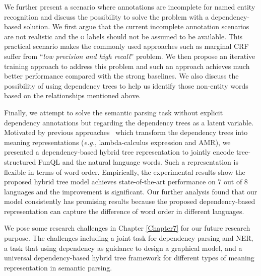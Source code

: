 We further present a scenario where annotations are incomplete for named entity recognition and discuss the possibility to solve the problem with a dependency-based solution.
We first argue that the current incomplete annotation scenarios are not realistic and the \textsc{o} labels should not be assumed to be available. 
This practical scenario makes the commonly used approaches such as marginal CRF~\cite{greenberg2018marginal} suffer from ``\textit{low precision and high recall}'' problem. 
We then propose an iterative training approach to address this problem and such an approach achieves much better performance compared with the strong baselines.
We also discuss the possibility of using dependency trees to help us identify those non-entity words based on the relationships mentioned above. 


Finally, we attempt to solve the semantic parsing task without explicit dependency annotations but regarding the dependency trees as a latent variable. 
Motivated by previous approaches~\cite{reddy2016transforming,wang2015building} which transform the dependency trees into meaning representations (\textit{e.g.}, lambda-calculus expression and AMR), we presented a dependency-based hybrid tree representation to jointly encode tree-structured FunQL and the natural language words. 
Such a representation is flexible in terms of word order. 
Empirically, the experimental results show the proposed hybrid tree model achieves state-of-the-art performance on 7 out of 8 languages and the improvement is significant. 
Our further analysis found that our model consistently has promising results because the proposed dependency-based representation can capture the difference of word order in different languages. 

We pose some research challenges in Chapter \ref{Chapter7} for our future research purpose. 
The challenges including a joint task for dependency parsing and NER, a task that using dependency as guidance to design a graphical model, and a universal dependency-based hybrid tree framework for different types of meaning representation in semantic parsing. 




